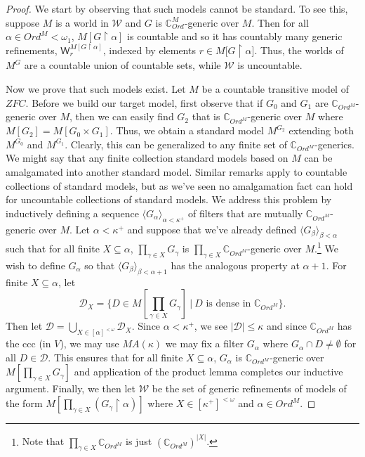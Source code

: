 \documentclass[10pt,a4paper]{amsart}
\numberwithin{equation}{section}
\numberwithin{figure}{section}
\theoremstyle{plain}
\theoremstyle{plain}
\theoremstyle{plain}
\theoremstyle{plain}
\theoremstyle{remark}
\theoremstyle{plain}
\theoremstyle{definition}
\begin{document}
\begin{proof}
We start by observing that such models cannot be standard. To see
this, suppose $M$ is a world in $\mathcal{W}$ and $G$ is $\mathbb{C}_{Ord}^{M}$-generic
over $M$. Then for all $\alpha\in Ord^{M}<\omega_{1}$, $M[G\restriction\alpha]$
is countable and so it has countably many generic refinements, $\mathsf{W}_{r}^{M[G\restriction\alpha]}$,
indexed by elements $r\in M[G\restriction\alpha${]}. Thus, the worlds
of $M^{G}$ are a countable union of countable sets, while $\mathcal{W}$
is uncountable.

Now we prove that such models exist. Let $M$ be a countable transitive
model of $ZFC$. Before we build our target model, first observe that
if $G_{0}$ and $G_{1}$ are $\mathbb{C}_{Ord^{M}}$-generic over
$M$, then we can easily find $G_{2}$ that is $\mathbb{C}_{Ord^{M}}$-generic
over $M$ where $M[G_{2}]=M[G_{0}\times G_{1}]$. Thus, we obtain
a standard model $M^{G_{2}}$ extending both $M^{G_{0}}$ and $M^{G_{1}}$.
Clearly, this can be generalized to any finite set of $\mathbb{C}_{Ord^{M}}$-generics.
We might say that any finite collection standard models based on $M$
can be amalgamated into another standard model. Similar remarks apply
to countable collections of standard models, but as we've seen no
amalgamation fact can hold for uncountable collections of standard
models. We address this problem by inductively defining a sequence
$\langle G_{\alpha}\rangle_{\alpha<\kappa^{+}}$ of filters that are
mutually $\mathbb{C}_{Ord^{M}}$-generic over $M$. Let $\alpha<\kappa^{+}$
and suppose that we've already defined $\langle G_{\beta}\rangle_{\beta<\alpha}$
such that for all finite $X\subseteq\alpha$, $\prod_{\gamma\in X}G_{\gamma}$
is $\prod_{\gamma\in X}\mathbb{C}_{Ord^{M}}$-generic over $M$.\footnote{Note that $\prod_{\gamma\in X}\mathbb{C}_{Ord^{M}}$ is just $(\mathbb{C}_{Ord^{M}})^{|X|}$.}
We wish to define $G_{\alpha}$ so that $\langle G_{\beta}\rangle_{\beta<\alpha+1}$
has the analogous property at $\alpha+1$. For finite $X\subseteq\alpha$,
let 
\[
\mathcal{D}_{X}=\{D\in M[\prod_{\gamma\in X}G_{\gamma}]\ |\ D\text{ is dense in }\mathbb{C}_{Ord^{M}}\}.
\]
Then let $\mathcal{D}=\bigcup_{X\in[\alpha]^{<\omega}}\mathcal{D}_{X}$.
Since $\alpha<\kappa^{+}$, we see $|\mathcal{D}|\leq\kappa$ and
since $\mathbb{C}_{Ord^{M}}$ has the ccc (in $V$), we may use $MA(\kappa)$
we may fix a filter $G_{\alpha}$ where $G_{\alpha}\cap D\neq\emptyset$
for all $D\in\mathcal{D}$. This ensures that for all finite $X\subseteq\alpha$,
$G_{\alpha}$ is $\mathbb{C}_{Ord^{M}}$-generic over $M[\prod_{\gamma\in X}G_{\gamma}]$
and application of the product lemma completes our inductive argument.
Finally, we then let $\mathcal{W}$ be the set of generic refinements
of models of the form $M[\prod_{\gamma\in X}(G_{\gamma}\restriction\alpha)]$
where $X\in[\kappa^{+}]^{<\omega}$ and $\alpha\in Ord^{M}$. 
\end{proof}
\end{document}
